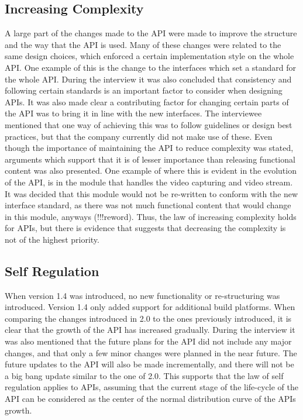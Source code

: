 \documentclass{sig-alternate}
\begin{document}
\subsection{Increasing Complexity} \label{law2}
A large part of the changes made to the API were made to improve the structure and the way that the API is used. Many of these changes were related to the same design choices, which enforced a certain implementation style on the whole API. One example of this is the change to the interfaces which set a standard for the whole API. During the interview it was also concluded that consistency and following certain standards is an important factor to consider when designing APIs. It was also made clear a contributing factor for changing certain parts of the API was to bring it in line with the new interfaces. The interviewee mentioned that one way of achieving this was to follow guidelines or design best practices, but that the company currently did not make use of these. Even though the importance of maintaining the API to reduce complexity was stated, arguments which support that it is of lesser importance than releasing functional content was also presented. One example of where this is evident in the evolution of the API, is in the module that handles the video capturing and video stream. It was decided that this module would not be re-written to conform with the new interface standard, as there was not much functional content that would change in this module, anyways (!!!reword). Thus, the law of increasing complexity holds for APIs, but there is evidence that suggests that decreasing the complexity is not of the highest priority. 

\subsection{Self Regulation} \label{law3}
When version 1.4 was introduced, no new functionality or re-structuring was introduced. Version 1.4 only added support for additional build platforms. When comparing the changes introduced in 2.0 to the ones previously introduced, it is clear that the growth of the API has increased gradually. During the interview it was also mentioned that the future plans for the API did not include any major changes, and that only a few minor changes were planned in the near future. The future updates to the API will also be made incrementally, and there will not be a big bang update similar to the one of 2.0. This supports that the law of self regulation applies to APIs, assuming that the current stage of the life-cycle of the API can be considered as the center of the normal distribution curve of the APIs growth. 
\end{document}
